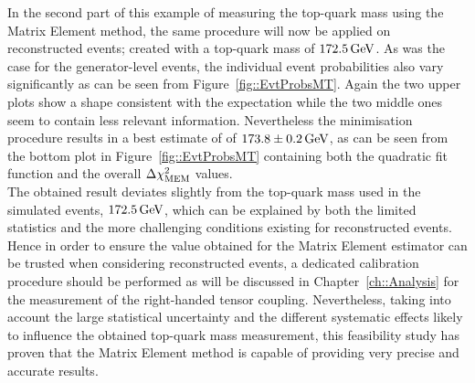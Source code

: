 In the second part of this example of measuring the top-quark mass using the Matrix Element method, the same procedure will now be applied on reconstructed events; created with a top-quark mass of $172.5 \, \mathrm{GeV}$.
As was the case for the generator-level events, the individual event probabilities also vary significantly as can be seen from Figure~\ref{fig::EvtProbsMT}. Again the two upper plots show a shape consistent with the expectation while the two middle ones seem to contain less relevant information.
Nevertheless the minimisation procedure results in a best estimate of of $173.8 \pm 0.2 \, \mathrm{GeV}$, as can be seen from the bottom plot in Figure~\ref{fig::EvtProbsMT} containing both the quadratic fit function and the overall $\Delta \chi^{2}_{\textrm{MEM}}$ values.
\\
The obtained result deviates slightly from the top-quark mass used in the simulated events, $172.5 \, \mathrm{GeV}$, which can be explained by both the limited statistics and the more challenging conditions existing for reconstructed events. Hence in order to ensure the value obtained for the Matrix Element estimator can be trusted when considering reconstructed events, a dedicated calibration procedure should be performed as  will be discussed in Chapter~\ref{ch::Analysis} for the measurement of the right-handed tensor coupling.
Nevertheless, taking into account the large statistical uncertainty and the different systematic effects likely to influence the obtained top-quark mass measurement, this feasibility study has proven that the Matrix Element method is capable of providing very precise and accurate results.
